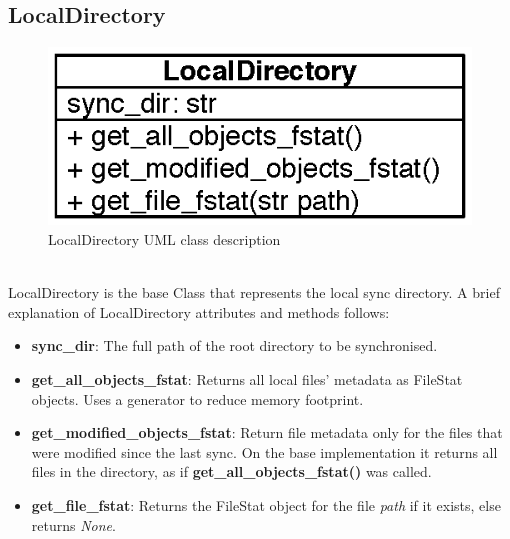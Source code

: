   \subsection{LocalDirectory}
    \begin{figure}[!htpb]
      \centering
      \includegraphics{Images/LocalDir.eps}
      \caption{LocalDirectory UML class description}
      \label{fig:localdir_uml}
    \end{figure}\\
    LocalDirectory is the base Class that represents the local sync directory. A brief explanation of LocalDirectory attributes and methods follows:
    \begin{itemize}
      \item \textbf{sync\_dir}: The full path of the root directory to be synchronised.\\

      \item \textbf{get\_all\_objects\_fstat}: Returns all local files' metadata as FileStat objects. Uses a generator to reduce memory footprint.
      \item \textbf{get\_modified\_objects\_fstat}: Return file metadata only for the files that were modified since the last sync. On the base implementation it returns all files in the directory, as if \textbf{get\_all\_objects\_fstat()} was called.
      \item \textbf{get\_file\_fstat}: Returns the FileStat object for the file \emph{path} if it exists, else returns \emph{None}.
    \end{itemize}


